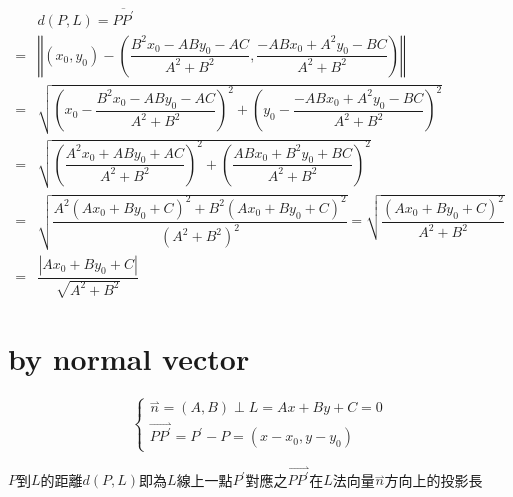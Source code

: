 \documentclass[
]{book}
\theoremstyle{definition}
\theoremstyle{definition}
\theoremstyle{definition}
\theoremstyle{definition}
\theoremstyle{remark}
\begin{document}
\[
\begin{aligned}
 & d\left(P,L\right)=\overline{PP^{\prime}}\\
= & \left\Vert \left(x_{0},y_{0}\right)-\left(\dfrac{B^{2}x_{0}-ABy_{0}-AC}{A^{2}+B^{2}},\dfrac{-ABx_{0}+A^{2}y_{0}-BC}{A^{2}+B^{2}}\right)\right\Vert \\
= & \sqrt{\left(x_{0}-\dfrac{B^{2}x_{0}-ABy_{0}-AC}{A^{2}+B^{2}}\right)^{2}+\left(y_{0}-\dfrac{-ABx_{0}+A^{2}y_{0}-BC}{A^{2}+B^{2}}\right)^{2}}\\
= & \sqrt{\left(\dfrac{A^{2}x_{0}+ABy_{0}+AC}{A^{2}+B^{2}}\right)^{2}+\left(\dfrac{ABx_{0}+B^{2}y_{0}+BC}{A^{2}+B^{2}}\right)^{2}}\\
= & \sqrt{\dfrac{A^{2}\left(Ax_{0}+By_{0}+C\right)^{2}+B^{2}\left(Ax_{0}+By_{0}+C\right)^{2}}{\left(A^{2}+B^{2}\right)^{2}}}=\sqrt{\dfrac{\left(Ax_{0}+By_{0}+C\right)^{2}}{A^{2}+B^{2}}}\\
= & \dfrac{\left|Ax_{0}+By_{0}+C\right|}{\sqrt{A^{2}+B^{2}}}
\end{aligned}
\]

\section{by normal vector}\label{by-normal-vector}

\[
\begin{cases}
\overset{\rightharpoonup}{n}=\left(A,B\right)\perp L=Ax+By+C=0\\
\overset{\rightharpoonup}{PP^{\prime}}=P^{\prime}-P=\left(x-x_{0},y-y_{0}\right)
\end{cases}
\]

\begin{CJK}{UTF8}{bsmi}
$P$到$L$的距離$d\left(P,L\right)$即為$L$線上一點$P^{\prime}$對應之$\overset{\rightharpoonup}{PP^{\prime}}$在$L$法向量$\overset{\rightharpoonup}{n}$方向上的投影長
\end{CJK}
\end{document}
